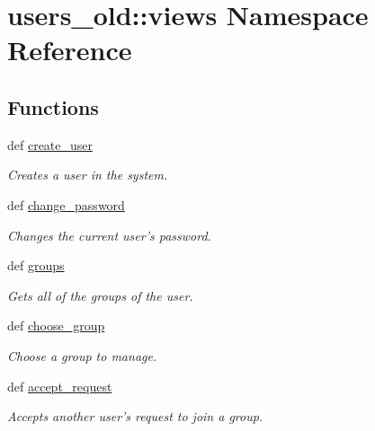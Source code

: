 \hypertarget{namespaceusers__old_1_1views}{
\section{users\_\-old::views Namespace Reference}
\label{namespaceusers__old_1_1views}
}
\subsection*{Functions}
\begin{DoxyCompactItemize}
\item 
def \hyperlink{namespaceusers__old_1_1views_a0184aeafdf217bc01ec3cc0dd53fe68d}{create\_\-user}
\begin{DoxyCompactList}\small\item\em Creates a user in the system. \item\end{DoxyCompactList}\item 
def \hyperlink{namespaceusers__old_1_1views_a2ed4de357e1863e92c8e6c6f52c1c682}{change\_\-password}
\begin{DoxyCompactList}\small\item\em Changes the current user's password. \item\end{DoxyCompactList}\item 
def \hyperlink{namespaceusers__old_1_1views_aacc31f077d06f29d3a04ed7da358b9fa}{groups}
\begin{DoxyCompactList}\small\item\em Gets all of the groups of the user. \item\end{DoxyCompactList}\item 
def \hyperlink{namespaceusers__old_1_1views_ad7ec072dbeaf02386314b35a401a0fe5}{choose\_\-group}
\begin{DoxyCompactList}\small\item\em Choose a group to manage. \item\end{DoxyCompactList}\item 
def \hyperlink{namespaceusers__old_1_1views_a3ed6754701029b577ea0b7694e2141bc}{accept\_\-request}
\begin{DoxyCompactList}\small\item\em Accepts another user's request to join a group. \item\end{DoxyCompactList}\item 

\end{DoxyCompactItemize}
